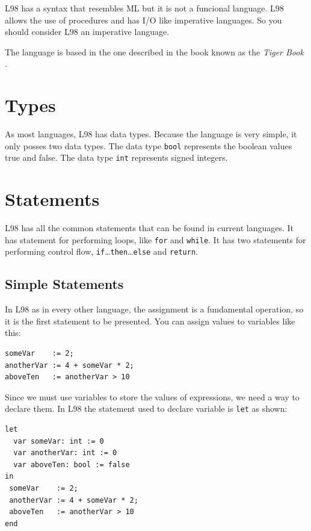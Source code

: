 \documentclass[a4paper, 11pt]{report}
\newcommand{\keyword}[1]{\texttt{#1}}
\begin{document}
L98 has a syntax that resembles ML but it is not a funcional language. L98
allows the use of procedures and has I/O like imperative languages. So you
should consider L98 an imperative language.

The language is based in the one described in the book known as the \emph{Tiger
Book} \cite{tiger}.

\section{Types}

As most languages, L98 has data types. Because the language is very simple, it
only posses two data types. The data type \keyword{bool} represents the boolean
values true and false. The data type \keyword{int} represents signed integers.

\section{Statements}

L98 has all the common statements that can be found in current
languages. It has statement for performing loops, like \keyword{for}
and \keyword{while}. It has two statements for performing control
flow, \keyword{if}\dots\keyword{then}\dots\keyword{else} and
\keyword{return}.

\subsection{Simple Statements}

In L98 as in every other language, the assignment is a fundamental
operation, so it is the first statement to be presented. You can assign
values to variables like this:

\begin{lstlisting}
someVar    := 2;
anotherVar := 4 + someVar * 2;
aboveTen   := anotherVar > 10
\end{lstlisting}

Since we must use variables to store the values of expressions, we
need a way to declare them. In L98 the statement used to declare
variable is \keyword{let} as shown:

\begin{lstlisting}
let
  var someVar: int := 0
  var anotherVar: int := 0
  var aboveTen: bool := false
in
 someVar    := 2;
 anotherVar := 4 + someVar * 2;
 aboveTen   := anotherVar > 10
end
\end{lstlisting}
\end{document}
